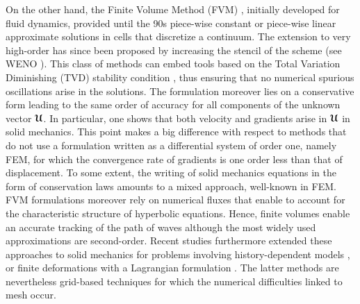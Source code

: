 On the other hand, the Finite Volume Method (FVM) \cite{Leveque}, initially developed for fluid dynamics, provided until the 90s piece-wise constant or piece-wise linear approximate solutions in cells that discretize a continuum.
The extension to very high-order has since been proposed by increasing the stencil of the scheme (see WENO \cite{WENO}).
This class of methods can embed tools based on the Total Variation Diminishing (TVD) stability condition \cite{Harten}, thus ensuring that no numerical spurious oscillations arise in the solutions. 
The formulation moreover lies on a conservative form leading to the same order of accuracy for all components of the unknown vector ${\boldsymbol{\mathcal{U}}}$.
In particular, one shows that both velocity and gradients arise in ${\boldsymbol{\mathcal{U}}}$ in solid mechanics.
This point makes a big difference with respect to methods that do not use a formulation written as a differential system of order one, namely FEM, for which the convergence rate of gradients is one order less than that of displacement.
To some extent, the writing of solid mechanics equations in the form of conservation laws amounts to a mixed approach, well-known in FEM.
FVM formulations moreover rely on numerical fluxes that enable to account for the characteristic structure of hyperbolic equations.
Hence, finite volumes enable an accurate tracking of the path of waves although the most widely used approximations are second-order. %
Recent studies furthermore extended these approaches to solid mechanics for problems involving history-dependent models \cite{Gavrilyuk,Thomas_EP}, or finite deformations with a Lagrangian formulation \cite{Lee_FVM,Haider_FVM}.
The latter methods are nevertheless grid-based techniques for which the numerical difficulties linked to mesh occur.

